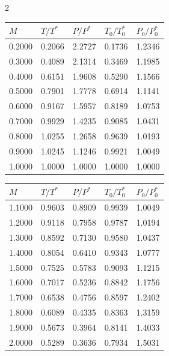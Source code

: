  
 \begin{multicols}{2}
 \begin{tabular}{|l|l|l|l|l|}
 \hline
 $M$ & $T/T^*$ & $P/P^*$ & $T_0/T_0^*$ & $P_0/P_0^*$ \\\hline
0.2000&0.2066&2.2727& 0.1736& 1.2346\\\hline
0.3000&0.4089&2.1314& 0.3469& 1.1985\\\hline
0.4000&0.6151&1.9608& 0.5290& 1.1566\\\hline
0.5000&0.7901&1.7778& 0.6914& 1.1141\\\hline
0.6000&0.9167&1.5957& 0.8189& 1.0753\\\hline
0.7000&0.9929&1.4235& 0.9085& 1.0431\\\hline
0.8000&1.0255&1.2658& 0.9639& 1.0193\\\hline
0.9000&1.0245&1.1246& 0.9921& 1.0049\\\hline
1.0000&1.0000&1.0000& 1.0000& 1.0000\\\hline
 \end{tabular}
 \begin{tabular}{|l|l|l|l|l|}
 \hline
 $M$ & $T/T^*$ & $P/P^*$ & $T_0/T_0^*$ & $P_0/P_0^*$ \\\hline
1.1000&0.9603&0.8909& 0.9939& 1.0049\\\hline
1.2000&0.9118&0.7958& 0.9787& 1.0194\\\hline
1.3000&0.8592&0.7130& 0.9580& 1.0437\\\hline
1.4000&0.8054&0.6410& 0.9343& 1.0777\\\hline
1.5000&0.7525&0.5783& 0.9093& 1.1215\\\hline
1.6000&0.7017&0.5236& 0.8842& 1.1756\\\hline
1.7000&0.6538&0.4756& 0.8597& 1.2402\\\hline
1.8000&0.6089&0.4335& 0.8363& 1.3159\\\hline
1.9000&0.5673&0.3964& 0.8141& 1.4033\\\hline
2.0000&0.5289&0.3636& 0.7934& 1.5031\\\hline
 \end{tabular}
 \end{multicols}
 
